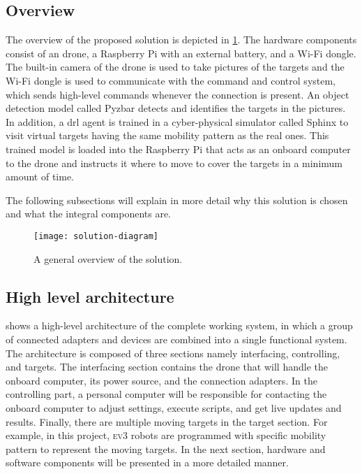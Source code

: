 \documentclass[../main.tex]{subfiles}
\begin{document}
\subsection{Overview}

The overview of the proposed solution is depicted in 
\cref{fig:solution-overview}. 
The hardware components consist of an \anafi drone,
a Raspberry Pi with an external battery, and a Wi-Fi
dongle. The built-in camera of the drone is used to
take pictures of the targets and the Wi-Fi dongle
is used to communicate with the command and control
system, which sends high-level commands whenever the
connection is present. 
An object detection model called Pyzbar detects and identifies the
targets in the pictures. 
In addition, a \gls{drl} agent is trained 
in a cyber-physical simulator called Sphinx to
visit virtual targets having the same mobility pattern as the
real ones.
This trained model is loaded into the Raspberry Pi that acts
as an onboard computer to the \anafi drone and instructs
it where to move to cover the targets in a minimum amount
of time.

The following subsections will
explain in more detail why this solution is chosen
and what the integral components are.

\begin{figure}[tbp]
	\centering
	\texttt{[image: solution-diagram]}
	\caption{A general overview of the solution.}
	\label{fig:solution-overview}
\end{figure}

\subsection{High level architecture}

 shows a high-level architecture 
of the complete working system, in which a group 
of connected adapters and devices are combined into 
a single functional system. 
The architecture is composed of three sections namely
interfacing, controlling, and targets. 
The interfacing section contains the drone that 
will handle the onboard computer, its power source, 
and the connection adapters. 
In the controlling part, a personal computer 
will be responsible for contacting the onboard computer 
to adjust settings, execute scripts, and get 
live updates and results. 
Finally, there are multiple moving targets 
in the target section. For example, 
in this project, \textsc{ev}3 robots are programmed with specific
mobility pattern to represent the moving targets.
In the next section, hardware and software components 
will be presented in a more detailed manner.
\end{document}
